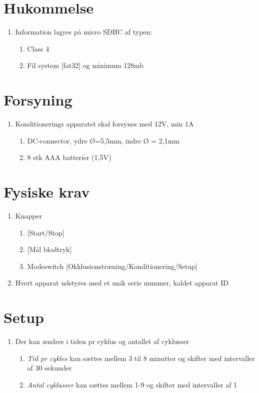	
	\section{Hukommelse}
	\begin{enumerate}
		\setlength\itemsep{0cm} %
		\item Information lagres på micro SDHC af typen:
		\begin{enumerate}
			\item Class 4
			\item Fil system [fat32] og minimum 128mb
		\end{enumerate}
	\end{enumerate}
	
	\section{Forsyning}
	\begin{enumerate}
		\setlength\itemsep{0cm} %
		\item Konditionerings apparatet skal forsynes med 12V, min 1A
		\begin{enumerate}
			\item DC-connector, ydre Ø=5,5mm, indre Ø = 2,1mm
			\item 8 stk AAA batterier (1,5V)
		\end{enumerate}
	\end{enumerate}
	
	\section{Fysiske krav}
	\begin{enumerate}
		\setlength\itemsep{0cm} %
		\item Knapper
		\begin{enumerate}
			\item  {[}Start/Stop]
			\item {[}Mål blodtryk]
			\item Modeswitch [Okklusionstræning/Konditionering/Setup]
		\end{enumerate}
		\item Hvert apparat udstyres med et unik serie nummer, kaldet apparat ID
	\end{enumerate}
	
	\section{Setup}
	\begin{enumerate}
		\setlength\itemsep{0cm} %
		\item Der kan ændres i tiden pr cyklus og antallet af cyklusser
		\begin{enumerate}
			\item \textit{Tid pr cykles} kan sættes mellem 3 til 8 minutter og skifter med intervaller af 30 sekunder
			\item \textit{Antal cyklusser }kan sættes mellem 1-9 og skifter med intervaller af 1
		\end{enumerate}
	\end{enumerate}